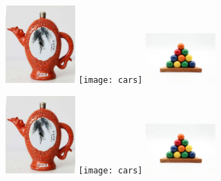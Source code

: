 \documentclass{ctexart}
\begin{document}
\includegraphics[width=0.2\textwidth]{bottle}
\texttt{[image: cars]}
\includegraphics[width=0.2\textwidth]{balls}

\includegraphics[angle=-45,width=0.2\textwidth]{bottle}
\texttt{[image: cars]}
\includegraphics[angle=90,width=0.2\textwidth]{balls}
\end{document}
